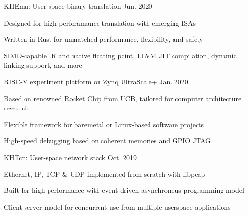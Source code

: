

\begin{cventries}

  \cventry
    {KHEmu: User-space binary translation}
    {}{}
    {Jun. 2020} %
    {
      \begin{cvitems} %
        \item {Designed for high-perforamance translation with emerging ISAs}
        \item {Written in Rust for unmatched performance, flexibility, and safety}
        \item {SIMD-capable IR and native floating point, LLVM JIT compilation, dynamic linking support, and more}
      \end{cvitems}
    }

  \cventry
    {RISC-V experiment platform on Zynq UltraScale+} %
    {}{}
    {Jan. 2020} %
    {
      \begin{cvitems} %
        \item {Based on renowned Rocket Chip from UCB, tailored for computer architecture research}
        \item {Flexible framework for baremetal or Linux-based software projects}
        \item {High-speed debugging based on coherent memories and GPIO JTAG}
      \end{cvitems}
    }

  \cventry
    {KHTcp: User-space network stack} %
    {}{}
    {Oct. 2019} %
    {
        \begin{cvitems} %
        \item {Ethernet, IP, TCP \& UDP implemented from scratch with libpcap}
        \item {Built for high-performance with event-driven asynchronous programming model}
        \item {Client-server model for concurrent use from multiple userspace applications}
        \end{cvitems}
    }

\end{cventries}

